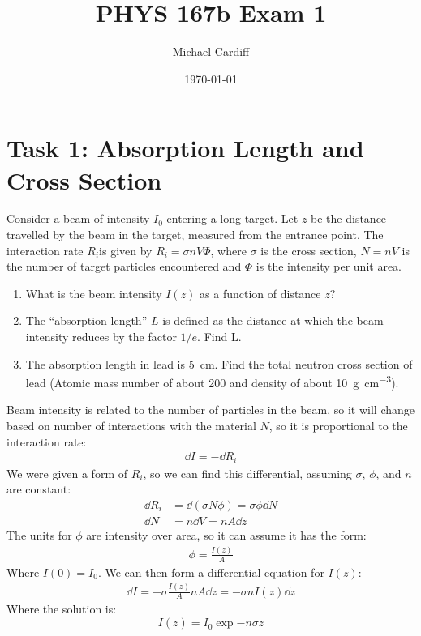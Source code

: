 \documentclass[12pt]{article}
\title{\vspace{-3em}PHYS 167b Exam 1}
\author{Michael Cardiff}
\date{\today}
\begin{document}
\maketitle
\section*{Task 1: Absorption Length and Cross Section}
\begin{problem}
  Consider a beam of intensity $I_0$ entering a long target. Let $z$ be the distance travelled by the beam in the target, measured from the entrance point. The interaction rate $R_i$is given by $R_i=\sigma nV\Phi$, where $\sigma$ is the cross section, $N=nV$ is the number of target particles encountered and $\Phi$ is the intensity per unit area.
  \begin{enumerate}
  \item What is the beam intensity $I(z)$ as a function of distance $z$?
  \item The ``absorption length'' $L$ is defined as the distance at which the beam intensity reduces by the factor $1/e$. Find L.
  \item The absorption length in lead is \SI{5}{cm}. Find the total neutron cross section of lead (Atomic mass number of about 200 and density of about \SI{10}{g.cm^{-3}}).
  \end{enumerate}
\end{problem}
Beam intensity is  related to the number of particles in the beam, so it will change based on number of interactions with the material $N$, so it is proportional to the interaction rate:
\begin{align*}
  \dd{I}=-\dd{R_i}
\end{align*}
We were given a form of $R_i$, so we can find this differential, assuming $\sigma$, $\phi$, and $n$ are constant:
\begin{align*}
  \dd{R_i}&=\dd{(\sigma N \phi)}=\sigma\phi\dd{N}\\
  \dd{N}&=n\dd{V}=nA\dd{z}
\end{align*}
The units for $\phi$ are intensity over area, so it can assume it has the form:
\begin{align*}
  \phi=\frac{I(z)}{A}
\end{align*}
Where $I(0)=I_0$. We can then form a differential equation for $I(z)$:
\begin{align*}
  \dd{I}=-\sigma\frac{I(z)}{A}nA\dd{z}=-\sigma nI(z)\dd{z}
\end{align*}
Where the solution is:
\begin{equation}
  \label{eq:p1a}
  \boxed{I(z)=I_0\exp{-n\sigma z}}
\end{equation}
\end{document}
